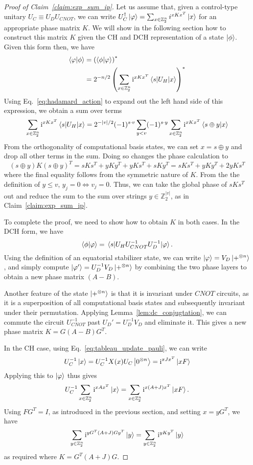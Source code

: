 \begin{proof}[Proof of Claim~\ref{claim:exp_sum_ip}]
Let us assume that, given a control-type unitary $U_{C}\equiv U_{D}U_{CNOT}$, we can write $U_{C}^{\dagger}\ket{\varphi}=\sum_{x\in\mathbb{Z}_{2}^{n}}i^{xKx^{T}}\ket{x}$ for an appropriate phase matrix $K$. We will show in the following section how to construct this matrix $K$ given the CH and DCH representation of a state $\ket{\phi}$. Given this form then, we have
\begin{align*}
\braket{\varphi}{\phi} &= \left(\braket{\phi}{\varphi}\right)^{*} \\ 
&= 2^{-n/2}\left(\sum_{x\in\mathbb{Z}_{2}^{n}}\mathi^{xKx^{T}} \matrixel{s}{U_{H}}{x} \right)^{*}\\
\end{align*}
Using Eq.~\ref{eq:hadamard_action} to expand out the left hand side of this expression, we obtain a sum over terms
\[\sum_{x\in\mathbb{Z}_{2}^{n}}\mathi^{xKx^{T}} \matrixel{s}{U_{H}}{x} = 2^{-\vert v\vert/2}(-1)^{s\cdot v}\sum_{y<v}(-1)^{s\cdot y}\sum_{x\in\mathbb{Z}_{2}^{n}}\mathi^{xKx^{T}}\braket{s\oplus y}{x}\]
From the orthogonality of computational basis states, we can set $x=s\oplus y$ and drop all other terms in the sum. Doing so changes the phase calculation to
\[(s\oplus y)K(s\oplus y)^{T}=sKs^{T}+yKy^{T}+yKs^{T}+sKy^{T} = sKs^{T}+yKy^{T}+2yKs^{T} \]
where the final equality follows from the symmetric nature of $K$. From the the definition of $y\leq v$, $y_{j}=0\iff v_{j}=0$. Thus, we can take the global phase of $sKs^{T}$ out and reduce the sum to the sum over strings $y\in\mathbb{Z}_{2}^{\vert v\vert}$, as in Claim~\ref{claim:exp_sum_ip}.\par
To complete the proof, we need to show how to obtain $K$ in both cases. In the DCH form, we have
\[\braket{\phi}{\varphi}=\matrixel{s}{U_{H}U_{CNOT}^{-1}U_{D}^{-1}}{\varphi}.\]
Using the definition of an equatorial stabilizer state, we can write $\ket{\varphi}=V_{D}\ket{+^{\otimes n}}$, and simply compute $\ket{\varphi'}=U_{D}^{-1}V_{D}\ket{+^{\otimes n}}$ by combining the two phase layers to obtain a new phase matrix $(A-B)$.\par
Another feature of the state $\ket{+^{\otimes n}}$ is that it is invariant under $CNOT$ circuits, as it is a superposition of all computational basis states and subsequently invariant under their permutation. Applying Lemma~\ref{lem:dc_conjugtation}, we can commute the circuit $U_{CNOT}^{-1}$ past $U_{D}'=U_{D}^{-1}V_{D}$ and eliminate it. This gives a new phase matrix $K=G(A-B)G^{T}$.\par
In the CH case, using Eq.~\ref{eq:tableau_update_pauli}, we can write
\[U_{C}^{-1}\ket{x}=U_{C}^{-1}X(x)U_{C}\ket{0^{\otimes n}}=\mathrm{i}^{xJx^{T}}\ket{xF}\]
Applying this to $\ket{\varphi}$ thus gives
\[U_{C}^{-1}\sum_{x\in\mathbb{Z}_{2}^{n}}\mathrm{i}^{xAx^{T}}\ket{x}=\sum_{x\in\mathbb{Z}_{2}^{n}}\mathrm{i}^{x(A+J)x^{T}}\ket{xF}.\]
Using $FG^{T}=I$, as introduced in the previous section, and setting $x=yG^{T}$, we have
\[\sum_{y\in\mathbb{Z}_{2}^{n}}\mathrm{i}^{yG^{T}(A+J)Gy^{T}}\ket{y}=\sum_{y\in\mathbb{Z}_{2}^{n}}\mathrm{i}^{yKy^{T}}\ket{y}\]
as required where $K=G^{T}(A+J)G$.
\end{proof}
